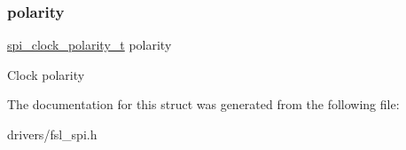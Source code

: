 \subsubsection{\texorpdfstring{polarity}{polarity}}
{\footnotesize\ttfamily \mbox{\hyperlink{group__spi__driver_ga9de95ac02ae859ac26534c06eb47b5b8}{spi\+\_\+clock\+\_\+polarity\+\_\+t}} polarity}

Clock polarity 

The documentation for this struct was generated from the following file\+:\begin{DoxyCompactItemize}
\item 
drivers/fsl\+\_\+spi.\+h\end{DoxyCompactItemize}
